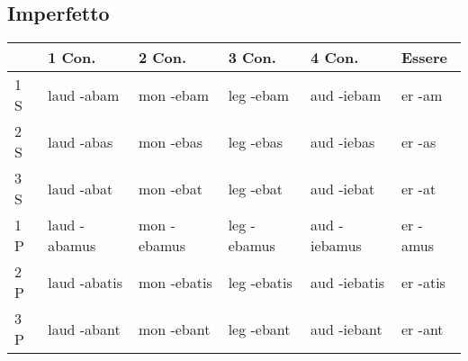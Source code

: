 \subsection{Imperfetto}


\begin{table}[h!]
     \centering
     \begin{tabular}{|l|l|l|l|l|l|}
        \hline
         & \textbf{1 Con.} & \textbf{2 Con.} & \textbf{3 Con.} & \textbf{4 Con.} & \textbf{Essere}\\
        \hline
         1 S & laud -abam   & mon -ebam   & leg -ebam   & aud -iebam   & er -am \\
        \hline
         2 S & laud -abas   & mon -ebas   & leg -ebas   & aud -iebas   & er -as \\
        \hline
         3 S & laud -abat   & mon -ebat   & leg -ebat   & aud -iebat   & er -at \\
        \hline
         1 P & laud -abamus & mon -ebamus & leg -ebamus & aud -iebamus & er -amus\\
        \hline
         2 P & laud -abatis & mon -ebatis & leg -ebatis & aud -iebatis & er -atis\\
        \hline
         3 P & laud -abant  & mon -ebant  & leg -ebant  & aud -iebant  & er -ant\\
        \hline
     \end{tabular}
\end{table}

